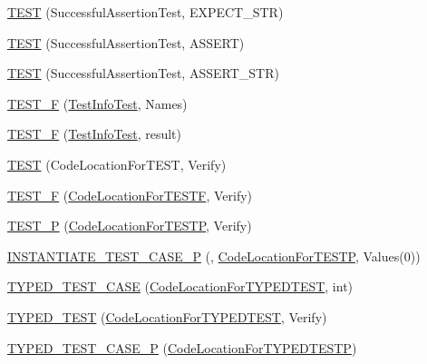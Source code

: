 \begin{DoxyCompactItemize}
\item 
\hyperlink{namespacetesting_a9b1e4b53f277d25e6d6413a0004481bb}{T\+E\+ST} (Successful\+Assertion\+Test, E\+X\+P\+E\+C\+T\+\_\+\+S\+TR)
\item 
\hyperlink{namespacetesting_afbe4c8233faff6eba04902b3cb041632}{T\+E\+ST} (Successful\+Assertion\+Test, A\+S\+S\+E\+RT)
\item 
\hyperlink{namespacetesting_a83dfac108c207258287b9f7aa9171e8a}{T\+E\+ST} (Successful\+Assertion\+Test, A\+S\+S\+E\+R\+T\+\_\+\+S\+TR)
\item 
\hyperlink{namespacetesting_acd53db89097aba1468724d6446069b1e}{T\+E\+S\+T\+\_\+F} (\hyperlink{classtesting_1_1_test_info_test}{Test\+Info\+Test}, Names)
\item 
\hyperlink{namespacetesting_ab00e29c00b3e29cdfa21d23b79dd3776}{T\+E\+S\+T\+\_\+F} (\hyperlink{classtesting_1_1_test_info_test}{Test\+Info\+Test}, result)
\item 
\hyperlink{namespacetesting_af597d0ad4de0197141b78e9c1035e491}{T\+E\+ST} (Code\+Location\+For\+T\+E\+ST, Verify)
\item 
\hyperlink{namespacetesting_a782ec43081903a0aaa6d009218eba2a8}{T\+E\+S\+T\+\_\+F} (\hyperlink{classtesting_1_1_code_location_for_t_e_s_t_f}{Code\+Location\+For\+T\+E\+S\+TF}, Verify)
\item 
\hyperlink{namespacetesting_af05768b7e2f14652d2c4f274ba1a5544}{T\+E\+S\+T\+\_\+P} (\hyperlink{classtesting_1_1_code_location_for_t_e_s_t_p}{Code\+Location\+For\+T\+E\+S\+TP}, Verify)
\item 
\hyperlink{namespacetesting_a5b049e97e9082df909e4a0f740ff5d02}{I\+N\+S\+T\+A\+N\+T\+I\+A\+T\+E\+\_\+\+T\+E\+S\+T\+\_\+\+C\+A\+S\+E\+\_\+P} (, \hyperlink{classtesting_1_1_code_location_for_t_e_s_t_p}{Code\+Location\+For\+T\+E\+S\+TP}, Values(0))
\item 
\hyperlink{namespacetesting_af0459cc6cdfbbae821caf802c7f2bb72}{T\+Y\+P\+E\+D\+\_\+\+T\+E\+S\+T\+\_\+\+C\+A\+SE} (\hyperlink{classtesting_1_1_code_location_for_t_y_p_e_d_t_e_s_t}{Code\+Location\+For\+T\+Y\+P\+E\+D\+T\+E\+ST}, int)
\item 
\hyperlink{namespacetesting_a400c572f732b06e836d6b3a5adfc4cf7}{T\+Y\+P\+E\+D\+\_\+\+T\+E\+ST} (\hyperlink{classtesting_1_1_code_location_for_t_y_p_e_d_t_e_s_t}{Code\+Location\+For\+T\+Y\+P\+E\+D\+T\+E\+ST}, Verify)
\item 
\hyperlink{namespacetesting_a439eefbc85668f74fd9e0c2cb7c7d0b0}{T\+Y\+P\+E\+D\+\_\+\+T\+E\+S\+T\+\_\+\+C\+A\+S\+E\+\_\+P} (\hyperlink{classtesting_1_1_code_location_for_t_y_p_e_d_t_e_s_t_p}{Code\+Location\+For\+T\+Y\+P\+E\+D\+T\+E\+S\+TP})

\end{DoxyCompactItemize}
